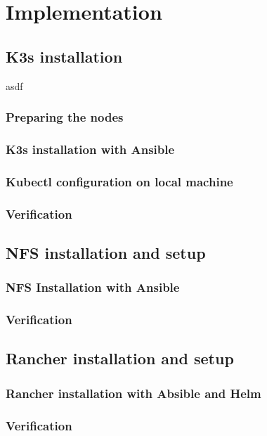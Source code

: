 
\chapter{Implementation} %
\label{Chapter3}

\section{K3s installation}
asdf
\subsection{Preparing the nodes}
\subsection{K3s installation with Ansible}
\subsection{Kubectl configuration on local machine}
\subsection{Verification}

\section{NFS installation and setup}
\subsection{NFS Installation with Ansible}
\subsection{Verification}

\section{Rancher installation and setup}
\subsection{Rancher installation with Absible and Helm}
\subsection{Verification}

